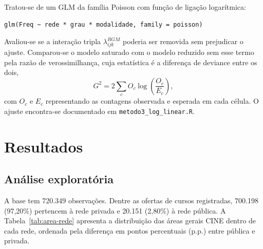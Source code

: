 \documentclass[12pt]{article}
\begin{document}
Tratou-se de um GLM da família Poisson com função de ligação logarítmica:
{\small
\begin{verbatim}
glm(Freq ~ rede * grau * modalidade, family = poisson)
\end{verbatim}
}

\noindent Avaliou-se se a interação tripla $\lambda_{ijk}^{RGM}$ poderia ser removida sem prejudicar o ajuste. Comparou-se o modelo saturado com o modelo reduzido sem esse termo pela razão de verossimilhança, cuja estatística é a diferença de deviance entre os dois,
\begin{equation}
G^2 = 2 \sum_{c} O_c \log\left(\frac{O_c}{E_c}\right),
\end{equation}
com $O_c$ e $E_c$ representando as contagens observada e esperada em cada célula. O ajuste encontra-se documentado em \texttt{metodo3\_log\_linear.R}.

\section{Resultados}

\subsection{Análise exploratória}
A base tem 720.349 observações. Dentre as ofertas de cursos registradas, 700.198 (97,20\%) pertencem à rede privada e 20.151 (2,80\%) à rede pública. A Tabela~\ref{tab:area-rede} apresenta a distribuição das áreas gerais CINE dentro de cada rede, ordenada pela diferença em pontos percentuais (p.p.) entre pública e privada.
\end{document}
